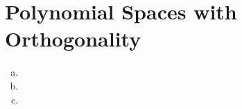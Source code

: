 \section{Polynomial Spaces with Orthogonality}\label{sec:p3}

\begin{enumerate}[(a)]
\item
\item
\item
\end{enumerate}